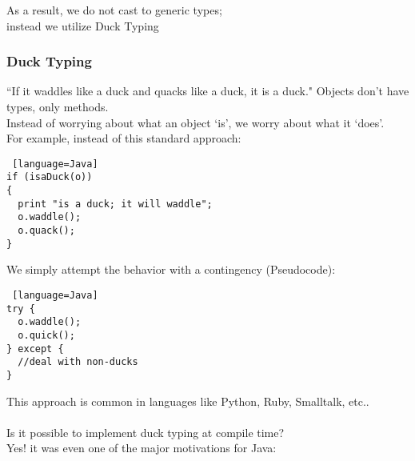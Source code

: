 \documentclass[../../lecture_notes.tex]{subfiles}
\begin{document}
\noindent As a result, we do not cast to generic types;\\
	\indent instead we utilize Duck Typing

\subsubsection*{Duck Typing}
“If it waddles like a duck and quacks like a duck, it is a duck."
Objects don’t have types, only methods.\\
Instead of worrying about what an object ‘is’, we worry about what it ‘does’.\\

\noindent For example, instead of this standard approach:
\begin{lstlisting} [language=Java]
if (isaDuck(o))
{
  print "is a duck; it will waddle";
  o.waddle(); 
  o.quack();
}
\end{lstlisting}
We simply attempt the behavior with a contingency (Pseudocode):
\begin{lstlisting} [language=Java]
try {
  o.waddle();
  o.quick();
} except {
  //deal with non-ducks
}
\end{lstlisting}
\noindent This approach is common in languages like Python, Ruby, Smalltalk, etc..\\
\\
Is it possible to implement duck typing at compile time?\\
\indent Yes! it was even one of the major motivations for Java:
\end{document}
